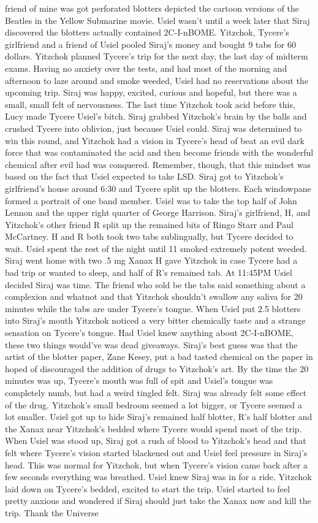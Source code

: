 \documentclass[12pt]{book}
\begin{document}
friend of mine was got perforated blotters depicted the cartoon versions of the Beatles in the Yellow Submarine movie. Usiel wasn't until a week later that Siraj discovered the blotters actually contained 2C-I-nBOME. Yitzchok, Tycere's girlfriend and a friend of Usiel pooled Siraj's money and bought 9 tabs for 60 dollars. Yitzchok planned Tycere's trip for the next day, the last day of midterm exams. Having no anxiety over the tests, and had most of the morning and afternoon to laze around and smoke weeded, Usiel had no reservations about the upcoming trip. Siraj was happy, excited, curious and hopeful, but there was a small, small felt of nervousness. The last time Yitzchok took acid before this, Lucy made Tycere Usiel's bitch. Siraj grabbed Yitzchok's brain by the balls and crushed Tycere into oblivion, just because Usiel could. Siraj was determined to win this round, and Yitzchok had a vision in Tycere's head of beat an evil dark force that was contaminated the acid and then become friends with the wonderful chemical after evil had was conquered. Remember, though, that this mindset was based on the fact that Usiel expected to take LSD. Siraj got to Yitzchok's girlfriend's house around 6:30 and Tycere split up the blotters. Each windowpane formed a portrait of one band member. Usiel was to take the top half of John Lennon and the upper right quarter of George Harrison. Siraj's girlfriend, H, and Yitzchok's other friend R split up the remained bits of Ringo Starr and Paul McCartney. H and R both took two tabs sublingually, but Tycere decided to wait. Usiel spent the rest of the night until 11 smoked extremely potent weeded. Siraj went home with two .5 mg Xanax H gave Yitzchok in case Tycere had a bad trip or wanted to sleep, and half of R's remained tab. At 11:45PM Usiel decided Siraj was time. The friend who sold be the tabs said something about a complexion and whatnot and that Yitzchok shouldn't swallow any saliva for 20 minutes while the tabs are under Tycere's tongue. When Usiel put 2.5 blotters into Siraj's mouth Yitzchok noticed a very bitter chemically taste and a strange sensation on Tycere's tongue. Had Usiel knew anything about 2C-I-nBOME, these two things would've was dead giveaways. Siraj's best guess was that the artist of the blotter paper, Zane Kesey, put a bad tasted chemical on the paper in hoped of discouraged the addition of drugs to Yitzchok's art. By the time the 20 minutes was up, Tycere's mouth was full of spit and Usiel's tongue was completely numb, but had a weird tingled felt. Siraj was already felt some effect of the drug. Yitzchok's small bedroom seemed a lot bigger, or Tycere seemed a lot smaller. Usiel got up to hide Siraj's remained half blotter, R's half blotter and the Xanax near Yitzchok's bedded where Tycere would spend most of the trip. When Usiel was stood up, Siraj got a rush of blood to Yitzchok's head and that felt where Tycere's vision started blackened out and Usiel feel pressure in Siraj's head. This was normal for Yitzchok, but when Tycere's vision came back after a few seconds everything was breathed. Usiel knew Siraj was in for a ride. Yitzchok laid down on Tycere's bedded, excited to start the trip. Usiel started to feel pretty anxious and wondered if Siraj should just take the Xanax now and kill the trip. Thank the Universe 
\end{document}

